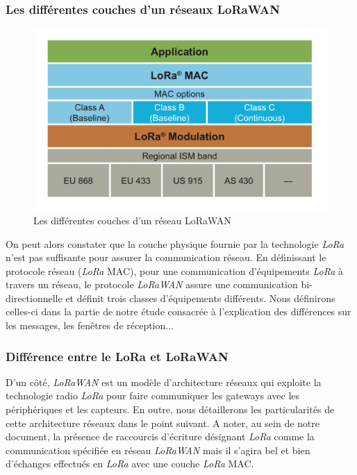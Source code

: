 \subsubsection{Les différentes couches d'un réseaux LoRaWAN}
\begin{figure}[h!]
\centering
\includegraphics[scale=0.6]{couchelora.png}
\caption{Les différentes couches d'un réseau LoRaWAN}
\end{figure}
On peut alors constater que la couche physique fournie par la technologie \textit{LoRa} n'est pas suffisante pour assurer la communication réseau. En définissant le protocole réseau (\textit{LoRa} MAC), pour une communication d'équipements \textit{LoRa} à travers un réseau, le protocole  \textit{LoRaWAN} assure une communication bi-directionnelle et définit trois classes d'équipements différents. Nous définirons celles-ci dans la partie de notre étude consacrée à l'explication des différences sur les messages, les fenêtres de réception...
\newpage
\subsubsection{Différence entre le LoRa et LoRaWAN}
D'un côté,  \textit{LoRaWAN} est un modèle d'architecture réseaux qui exploite la technologie radio \textit{LoRa} pour faire communiquer les gateways avec les périphériques et les capteurs. En outre, nous détaillerons les particularités de cette architecture réseaux dans le point suivant. A noter, au sein de notre document, la présence de raccourcis d'écriture désignant \textit{LoRa} comme la communication spécifiée en réseau  \textit{LoRaWAN} mais il s'agira bel et bien d'échanges effectués en \textit{LoRa} avec une couche \textit{LoRa} MAC. 
 
